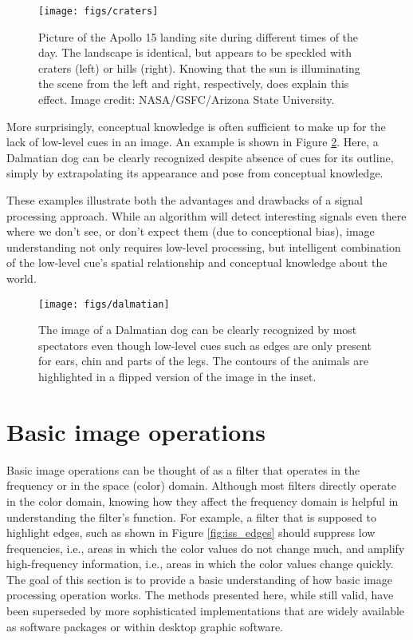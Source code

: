 \begin{figure}[!htb]
	\centering
		\texttt{[image: figs/craters]}
	\caption{Picture of the Apollo 15 landing site during different times of the day. The landscape is identical, but appears to be speckled with craters (left) or hills (right). Knowing that the sun is illuminating the scene from the left and right, respectively, does explain this effect. Image credit: NASA/GSFC/Arizona State University.
	\label{fig:craters}}
\end{figure}

More surprisingly, conceptual knowledge is often sufficient to make up for the lack of low-level cues in an image. An example is shown in Figure \ref{fig:dalmatian}. Here, a Dalmatian dog can be clearly recognized despite absence of cues for its outline, simply by extrapolating its appearance and pose from conceptual knowledge. 

These examples illustrate both the advantages and drawbacks of a signal processing approach. While an algorithm will detect interesting signals even there where we don't see, or don't expect them (due to conceptional bias), image understanding not only requires low-level processing, but intelligent combination of the low-level cue's spatial relationship and conceptual knowledge about the world. 


\begin{figure}
	\centering
		\texttt{[image: figs/dalmatian]}
	\caption{The image of a Dalmatian dog can be clearly recognized by most spectators even though low-level cues such as edges are only present for ears, chin and parts of the legs. The contours of the animals are highlighted in a flipped version of the image in the inset.
	\label{fig:dalmatian}}
\end{figure}

\section{Basic image operations}
Basic image operations can be thought of as a filter that operates in the frequency or in the space (color) domain. Although most filters directly operate in the color domain, knowing how they affect the frequency domain is helpful in understanding the filter's function. For example, a filter that is supposed to highlight edges, such as shown in Figure \ref{fig:iss_edges} should suppress low frequencies, i.e., areas in which the color values do not change much, and amplify high-frequency information, i.e., areas in which the color values change quickly. The goal of this section is to provide a basic understanding of how basic image processing operation works. The methods presented here, while still valid, have been superseded by more sophisticated implementations that are widely available as software packages or within desktop graphic software.

